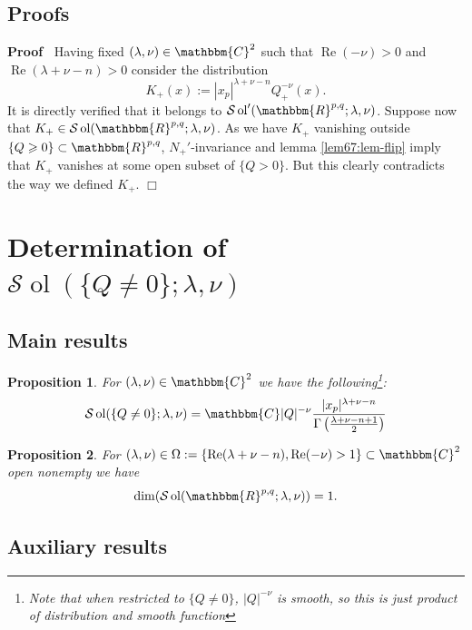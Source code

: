 \documentclass{article}
\newcommand{\assign}{:=}
\newcommand{\tmop}[1]{\ensuremath{\operatorname{#1}}}
\newenvironment{proof}{\noindent\textbf{Proof\ }}{\hspace*{\fill}$\Box$\medskip}
\numberwithin{definition}{section}
\numberwithin{lemma}{section}
\newtheorem{proposition}{Proposition}
\numberwithin{proposition}{section}
{\theorembodyfont{\rmfamily}\newtheorem{remark}{Remark}
\numberwithin{remark}{section}
}
\newcommand{\C}{{\mathbbm{C}}}\newcommand{\Z}{{\mathbbm{Z}}}
\begin{document}
\subsection{Proofs}

\begin{proof}
  Having fixed $(\lambda, \nu) \in \C^2$ such that $\tmop{Re} (- \nu) > 0$ and
  $\tmop{Re} (\lambda + \nu - n) > 0$ consider the distribution
  \[ K_+ (x) \assign | x_p |^{\lambda + \nu - n} Q_+^{- \nu} (x) . \]
  It is directly verified that it belongs to $\mathcal{S} \tmop{ol}' (
  \mathbbm{R}^{p, q} ; \lambda, \nu)$. Suppose now that $K_+ \in \mathcal{S}
  \tmop{ol} ( \mathbbm{R}^{p, q} ; \lambda, \nu)$. As we have $K_+$ vanishing
  outside $\{ Q \geqslant 0 \} \subset \mathbbm{R}^{p, q}$, $N_+'$-invariance
  and lemma \ref{lem67:lem-flip} imply that $K_+$ vanishes at some open subset
  of $\{ Q > 0 \}$. But this clearly contradicts the way we defined $K_+$.
\end{proof}

\section{Determination of $\mathcal{S} \tmop{ol} ( \{ Q \neq 0 \} ; \lambda,
\nu)$}\label{sec:lem67}

\subsection{Main results}

\begin{proposition}
  \label{lem67:prop-67}For $( \lambda, \nu) \in \mathbbm{C}^2$ we have the
  following{\footnote{Note that when restricted to $\{ Q \neq 0 \}$, $| Q |^{-
  \nu}$ is smooth, so this is just product of distribution and smooth
  function}}:
  \[ \mathcal{S} \tmop{ol} ( \{ Q \neq 0 \} ; \lambda, \nu) =\mathbbm{C} | Q
     |^{- \nu} \frac{| x_p |^{\lambda + \nu - n}}{\Gamma \left( \frac{\lambda
     + \nu - n + 1}{2} \right)} \]
\end{proposition}

\begin{proposition}
  \label{lem67:prop-dim1}For $( \lambda, \nu) \in \Omega \assign \{ \tmop{Re}
  ( \lambda + \nu - n), \tmop{Re} ( - \nu) > 1 \} \subset \mathbbm{C}^2$ open
  nonempty we have
  \[ \dim ( \mathcal{S} \tmop{ol} ( \mathbbm{R}^{p, q} ; \lambda, \nu)) = 1.
  \]
\end{proposition}

\subsection{Auxiliary results}
\end{document}
